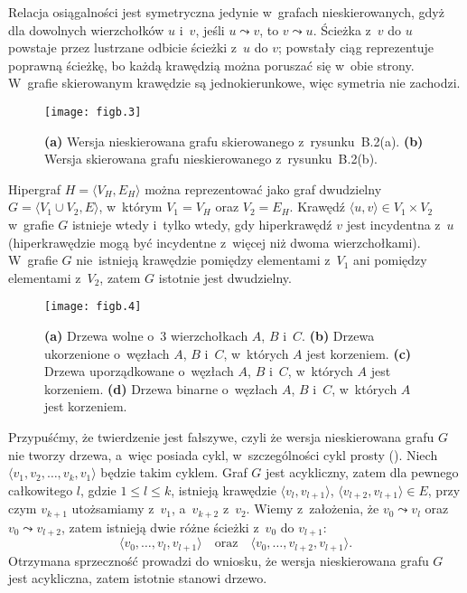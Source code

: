 Relacja osiągalności jest symetryczna jedynie w~grafach nieskierowanych, gdyż dla dowolnych wierzchołków $u$ i~$v$, jeśli $u\leadsto v$, to $v\leadsto u$. Ścieżka z~$v$ do $u$ powstaje przez lustrzane odbicie ścieżki z~$u$ do $v$; powstały ciąg reprezentuje poprawną ścieżkę, bo każdą krawędzią można poruszać się w~obie strony. W~grafie skierowanym krawędzie są jednokierunkowe, więc symetria nie zachodzi.

\exercise %
\begin{figure}[ht]
	\begin{center}
		\texttt{[image: figb.3]}
	\end{center}
	\caption{{\sffamily\bfseries(a)} Wersja nieskierowana grafu skierowanego z~rysunku~B.2(a). {\sffamily\bfseries(b)} Wersja skierowana grafu nieskierowanego z~rysunku~B.2(b).} \label{fig:B.4-5}
\end{figure}

\exercise %
Hipergraf $H=\langle V_H,E_H\rangle$ można reprezentować jako graf dwudzielny $G=\langle V_1\cup V_2,E\rangle$, w~którym $V_1=V_H$ oraz $V_2=E_H$. Krawędź $\langle u,v\rangle\in V_1\times V_2$ w~grafie $G$ istnieje wtedy i~tylko wtedy, gdy hiperkrawędź $v$ jest incydentna z~$u$ (hiperkrawędzie mogą być incydentne z~więcej niż dwoma wierzchołkami). W~grafie $G$ nie~istnieją krawędzie pomiędzy elementami z~$V_1$ ani pomiędzy elementami z~$V_2$, zatem $G$ istotnie jest dwudzielny.


\exercise %
\begin{figure}[ht]
	\begin{center}
		\texttt{[image: figb.4]}
	\end{center}
	\caption{{\sffamily\bfseries(a)} Drzewa wolne o~3 wierzchołkach $A$, $B$ i~$C$. {\sffamily\bfseries(b)} Drzewa ukorzenione o~węzłach $A$, $B$ i~$C$, w~których $A$ jest korzeniem. {\sffamily\bfseries(c)} Drzewa uporządkowane o~węzłach $A$, $B$ i~$C$, w~których $A$ jest korzeniem. {\sffamily\bfseries(d)} Drzewa binarne o~węzłach $A$, $B$ i~$C$, w~których $A$ jest korzeniem.} \label{fig:B.5-1}
\end{figure}

\exercise %
Przypuśćmy, że twierdzenie jest fałszywe, czyli że wersja nieskierowana grafu $G$ nie tworzy drzewa, a~więc posiada cykl, w~szczególności cykl prosty (). Niech $\langle v_1,v_2,\dots,v_k,v_1\rangle$ będzie takim cyklem. Graf $G$ jest acykliczny, zatem dla pewnego całkowitego $l$, gdzie $1\le l\le k$, istnieją krawędzie $\langle v_l,v_{l+1}\rangle$, $\langle v_{l+2},v_{l+1}\rangle\in E$, przy czym $v_{k+1}$ utożsamiamy z~$v_1$, a~$v_{k+2}$ z~$v_2$. Wiemy z~założenia, że $v_0\leadsto v_l$ oraz $v_0\leadsto v_{l+2}$, zatem istnieją dwie różne ścieżki z~$v_0$ do $v_{l+1}$:
\[
	\langle v_0,\dots,v_l,v_{l+1}\rangle \quad\text{oraz}\quad \langle v_0,\dots,v_{l+2},v_{l+1}\rangle.
\]
Otrzymana sprzeczność prowadzi do wniosku, że wersja nieskierowana grafu $G$ jest acykliczna, zatem istotnie stanowi drzewo.

